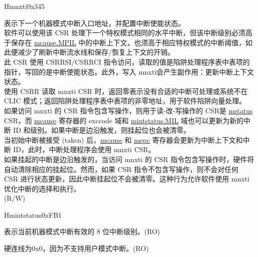 \begin{register}{H}{mnxti}{0x345}\label{regdesc:MNXTI_REG}
%
\regnewline%
\begin{regdesc}\begin{reglist}
\label{fielddesc:MNXTI}\item [MNXTI]
表示下一个机器模式中断入口地址，并配置中断使能状态。\\
软件可以使用该 CSR 处理下一个特权模式相同的水平中断，但该中断级别必须高于保存在 \hyperref[fielddesc:MCAUSE_MPIL]{{mcause.MPIL}} 中的中断上下文，也须高于相应特权模式的中断阈值，如此便减少了刷新中断流水线和保存/恢复上下文的开销。\\
此 CSR 使用 CSRRSI/CSRRCI 指令访问，读取的值是陷阱处理程序表中表项的指针，写回的是中断使能状态。此外，写入 mnxti会产生副作用：更新中断上下文状态。\\
使用 CSRR 读取 mnxti CSR 时，返回零表示没有合适的中断可处理或系统不在 CLIC 模式；返回陷阱处理程序表中表项的非零地址，用于软件陷阱向量处理。\\
如果访问 mnxti 的 CSR 指令包含写操作，则用于读-改-写操作的 CSR是 \hyperref[regdesc:MSTATUS]{mstatus} CSR，而 \hyperref[regdesc:MCAUSE]{mcause} 寄存器的 exccode 域和 \hyperref[fielddesc:MINTSTATUS_MIL]{mintstatus.MIL} 域也可以更新为新的中断 ID 和级别。如果中断是边沿触发，则挂起位也会被清零。\\
当初始中断被接受 (taken) 后，\hyperref[regdesc:MCAUSE]{mcause} 和 \hyperref[regdesc:MEPC]{mepc} 寄存器会更新为中断上下文和中断 ID，此时，中断处理程序会使用 mnxti CSR。\\
如果挂起的中断是边沿触发的，当访问 mnxti 的 CSR 指令包含写操作时，硬件将自动清除相应的挂起位。然而，如果 CSR 指令不包含写操作，则不会对任何 CSR 进行状态更新，因此中断挂起位不会被清零。这种行为允许软件使用 mnxti 优化中断的选择和执行。\\
(R/W)
\end{reglist}\end{regdesc}
\end{register}

\begin{register}{H}{mintstatus}{0xFB1}
\label{regdesc:MINTSTATUS}
%
%
%
\regnewline%
\begin{regdesc}\begin{reglist}
\label{fielddesc:MINTSTATUS_MIL}\item [MIL] 表示当前机器模式中断有效的 8 位中断级别。(RO)
\label{fielddesc:MINTSTATUS_UIL}\item [UIL] 硬连线为0x0，因为不支持用户模式中断。(RO)
\end{reglist}\end{regdesc}
\end{register}

